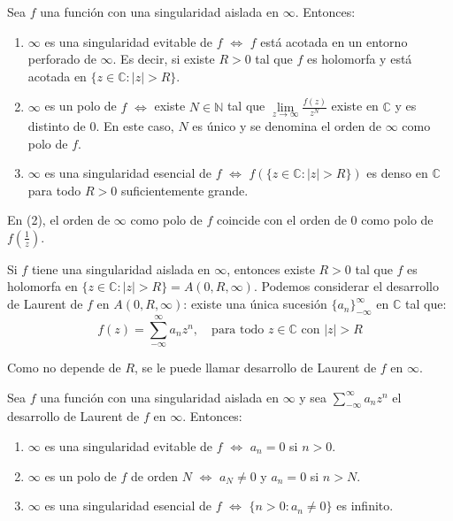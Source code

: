 \begin{proposition}
    Sea $f$ una función con una singularidad aislada en $\infty$.
    Entonces:
    \begin{enumerate}
        \item $\infty$ es una singularidad evitable de $f$ $\Leftrightarrow$ $f$ está acotada en un entorno perforado de $\infty$.
              Es decir, si existe $R > 0$ tal que $f$ es holomorfa y está acotada en $\{z \in \mathbb{C} : |z| > R\}$.
        \item $\infty$ es un polo de $f$ $\Leftrightarrow$ existe $N \in \mathbb{N}$ tal que $\lim\limits_{z \to \infty} \frac{f(z)}{z^N}$ existe en $\mathbb{C}$ y es distinto de 0.
              En este caso, $N$ es único y se denomina el orden de $\infty$ como polo de $f$.
        \item $\infty$ es una singularidad esencial de $f$ $\Leftrightarrow$ $f(\{z \in \mathbb{C} : |z| > R\})$ es denso en $\mathbb{C}$ para todo $R > 0$ suficientemente grande.
    \end{enumerate}
\end{proposition}

\begin{remark}
    En (2), el orden de $\infty$ como polo de $f$ coincide con el orden de 0 como polo de $f\left(\frac{1}{z}\right)$.
\end{remark}

Si $f$ tiene una singularidad aislada en $\infty$, entonces existe $R > 0$ tal que $f$ es holomorfa en $\{z \in \mathbb{C} : |z| > R\} = A(0, R, \infty)$.
Podemos considerar el desarrollo de Laurent de $f$ en $A(0, R, \infty)$: existe una única sucesión $\{a_n\}_{-\infty}^\infty$ en $\mathbb{C}$ tal que:
$$f(z) = \sum_{-\infty}^\infty a_nz^n, \quad \text{para todo } z \in \mathbb{C} \text{ con } |z| > R$$

Como no depende de $R$, se le puede llamar desarrollo de Laurent de $f$ en $\infty$.

\begin{proposition}
    Sea $f$ una función con una singularidad aislada en $\infty$ y sea $\sum_{-\infty}^\infty a_nz^n$ el desarrollo de Laurent de $f$ en $\infty$.
    Entonces:
    \begin{enumerate}
        \item $\infty$ es una singularidad evitable de $f$ $\Leftrightarrow$ $a_n = 0$ si $n > 0$.
        \item $\infty$ es un polo de $f$ de orden $N$ $\Leftrightarrow$ $a_N \neq 0$ y $a_n = 0$ si $n > N$.
        \item $\infty$ es una singularidad esencial de $f$ $\Leftrightarrow$ $\{n > 0 : a_n \neq 0\}$ es infinito.
    \end{enumerate}
\end{proposition}


